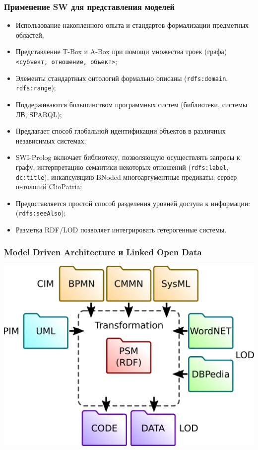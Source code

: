 \documentclass[10pt]{beamer}
\begin{document}
\begin{frame}[fragile]
  \frametitle{Применение SW для представления моделей}
  \begin{itemize}
  \item Использование накопленного опыта и стандартов формализации предметных областей;
  \item Представление T-Box и A-Box при помощи множества троек (графа) \texttt{<субъект, отношение, объект>};
  \item Элементы стандартных онтологий формально описаны (\verb|rdfs:domain|, \verb|rdfs:range|);
  \item Поддерживаются большинством программных систем (библиотеки, системы ЛВ, SPARQL);
  \item Предлагает способ глобальной идентификации объектов в различных независимых системах;
  \item SWI-Prolog включает библиотеку, позволяющую осуществлять запросы к графу, интерпретацию семантики некоторых отношений (\verb|rdfs:label|, \verb|dc:title|), инкапсуляцию BNoded многоаргументные предикаты; сервер онтологий ClioPatria;
  \item Предоставляется простой способ разделения уровней доступа к информации: (\verb|rdfs:seeAlso|);
  \item Разметка RDF/LOD позволяет интегрировать гетерогенные системы.
  \end{itemize}
\end{frame}
\begin{frame}
  \frametitle{Model Driven Architecture и Linked Open Data}
  \begin{center}
    \includegraphics[width=0.9\linewidth]{mda-overview.pdf}
  \end{center}
\end{frame}
\end{document}
